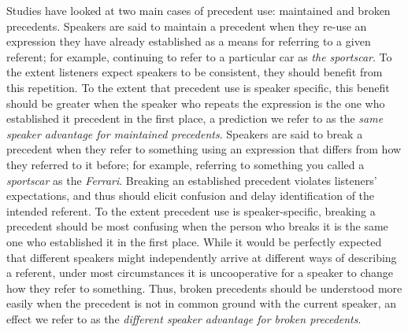 \documentclass[doc,fignum,apacite,floatsintext]{apa6}
\begin{document}
Studies have looked at two main cases of precedent use: maintained and broken precedents.  Speakers are said to maintain a precedent when they re-use an expression they have already established as a means for referring to a given referent; for example, continuing to refer to a particular car as \textit{the sportscar}.  To the extent listeners expect speakers to be consistent, they should benefit from this repetition.  To the extent that precedent use is speaker specific, this benefit should be greater when the speaker who repeats the expression is the one who established it precedent in the first place, a prediction we refer to as the \textit{same speaker advantage for maintained precedents}.  Speakers are said to break a precedent when they refer to something using an expression that differs from how they referred to it before; for example, referring to something you called a \textit{sportscar} as the \textit{Ferrari}.  Breaking an established precedent violates listeners' expectations, and thus should elicit confusion and delay identification of the intended referent.  To the extent  precedent use is speaker-specific, breaking a precedent should be most confusing when the person who breaks it is the same one who established it in the first place.  While it would be perfectly expected that different speakers might independently arrive at different ways of describing a referent, under most circumstances it is uncooperative for a speaker to change how they refer to something.  Thus, broken precedents should be understood more easily when the precedent is not in common ground with the current speaker, an effect we refer to as the \textit{different speaker advantage for broken precedents}.
\end{document}
